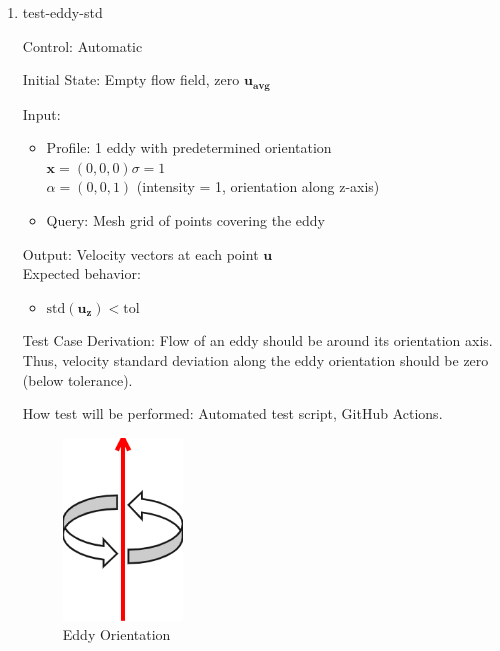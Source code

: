 \documentclass[12pt, titlepage]{article}
\begin{document}
\begin{enumerate}
  \newpage
  \item{test-eddy-std\\}

  Control: Automatic
            
  Initial State: Empty flow field, zero $\mathbf{u_{avg}}$
            
  Input:
  \begin{itemize}
    \item Profile: 1 eddy with predetermined orientation\\
    $\mathbf{x}=(0,0,0)$\tab$\sigma=1$\\
    $\alpha=(0,0,1)$ (intensity = 1, orientation along z-axis)
    \item Query: Mesh grid of points covering the eddy
  \end{itemize}
  Output: Velocity vectors at each point $\mathbf{u}$\\
  Expected behavior:
  \begin{itemize}
    \item $\text{std}(\mathbf{u_z}) < \text{tol}$
  \end{itemize}

  Test Case Derivation: Flow of an eddy should be around its orientation axis. Thus, velocity standard deviation along the eddy orientation should be zero (below tolerance).
            
  How test will be performed: Automated test script, GitHub Actions.

  \begin{figure}[h!]
    \begin{center}
    \includegraphics[width=0.3\textwidth]{eddy-orient.png}
    \caption{Eddy Orientation}
    \label{Fig_EddyOrient} 
    \end{center}
  \end{figure}

\end{enumerate}
\end{document}
